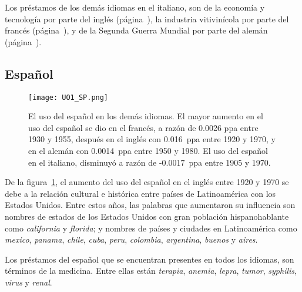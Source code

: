 Los préstamos de los demás idiomas en el italiano, son de la economía y tecnología por parte del inglés (página~\pageref{EN-D}), la industria vitivinícola por parte del francés (página~\pageref{FR-D}), y de la Segunda Guerra Mundial por parte del alemán (página~\pageref{GE-D}).

\label{DE-IT}



\subsection{Español} %
\begin{figure}[h!] %
	\centering
	\texttt{[image: UO1\_SP.png]}
	\caption{El uso del español en los demás idiomas. El mayor aumento en el uso del español se dio en el francés, a razón de 0.0026 ppa entre 1930 y 1955, después en el inglés con 0.016~ppa entre 1920 y 1970,  y en el alemán con 0.0014~ppa entre 1950 y 1980. El uso del español en el italiano, disminuyó a razón de -0.0017~ppa entre 1905 y 1970.}
	\label{fig.UO_SP}
	
\end{figure} %



De la figura~\ref{fig.UO_SP}, el aumento del uso del español en el inglés entre 1920 y 1970 se debe a la relación cultural e histórica entre países de Latinoamérica con los Estados Unidos. Entre estos años, las palabras que aumentaron su influencia son  nombres de estados de los Estados Unidos con gran población hispanohablante como \textit{california} y \textit{florida};  y nombres de países y ciudades en Latinoamérica como \textit{mexico}, \textit{panama}, \textit{chile}, \textit{cuba}, \textit{peru}, \textit{colombia}, \textit{argentina}, \textit{buenos} y \textit{aires}.

Los préstamos del español que se encuentran presentes en todos los idiomas, son términos de la medicina. Entre ellas están \textit{terapia}, \textit{anemia}, \textit{lepra}, \textit{tumor}, \textit{syphilis}, \textit{virus} y \textit{renal}.
 
